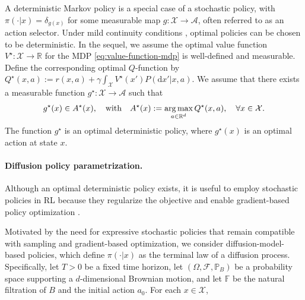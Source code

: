 \documentclass{article}
\newcommand{\1}{\mathbbm{1}}
\DeclareMathOperator*{\argmax}{arg\,max}
\numberwithin{equation}{section}
\def\to{\rightarrow}
\def\cX{\mathcal{X}}
\def\d{{\mathrm{d}}}
\begin{document}
{A deterministic Markov policy is a special case of a stochastic policy, with
\(\pi(\cdot|x)=\delta_{g(x)}\) for some measurable map \(g:\mathcal X\to\mathcal A\), often referred to as an action selector.
Under mild continuity conditions \cite[Theorem 4.2.3]{hernandez2012discrete},
optimal policies can be chosen to be deterministic. In the sequel, we assume the optimal value function $V^{\star}:\mathcal X\to \mathbb R$ for the MDP \eqref{eq:value-function-mdp} is well-defined and  measurable. Define  
the corresponding  optimal  $Q$-function by $Q^{\star}(x,a):=r(x,a)+\gamma\int_\cX V^{\star}(x')P(\d x'|x,a)$.
We assume  that there exists a measurable function $g^\star:\mathcal X\to\mathcal A$ such that 
\begin{equation}\label{eq:g_star}
g^\star(x)\in A^\star(x),
\quad 
\textnormal{with}
\quad 
A^{\star}(x):=\argmax_{a\in \mathbb{R}^{d}}Q^{\star}(x, a), \quad \forall x\in \mathcal X.
\end{equation}
The function $g^\star$ is   an optimal deterministic policy, where $g^\star (x)$  is an optimal   action at 
state $x$.  

\paragraph{Diffusion policy parametrization.}

Although an optimal deterministic policy exists, 
it is useful to employ 
stochastic policies in RL because they regularize the objective and enable gradient-based policy optimization 
\cite{haarnoja2018soft,schulman2015trust,schulman2017proximal,sutton1999policy}.}
 Motivated by the need for expressive stochastic policies that remain compatible with sampling and gradient-based optimization, we consider diffusion-model-based policies,
 which define $\pi(\cdot|x)$ as the terminal law of a diffusion process. 
Specifically, 
let  $T>0$ be a fixed time horizon,  let   $(\Omega,\mathcal F,\mathbb P_B)$ be a probability space   supporting a
$d$-dimensional Brownian motion, 
and let $\mathbb F$ be
the natural filtration of $B$ and the initial action $a_0$.
For  
each $x\in\mathcal X$,
\end{document}
